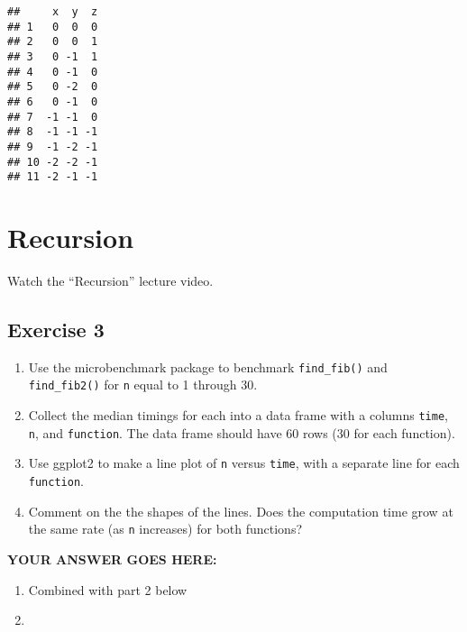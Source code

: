 \documentclass[
]{article}
\providecommand{\tightlist}{%
  \setlength{\itemsep}{0pt}\setlength{\parskip}{0pt}}
\begin{document}
\begin{verbatim}
##     x  y  z
## 1   0  0  0
## 2   0  0  1
## 3   0 -1  1
## 4   0 -1  0
## 5   0 -2  0
## 6   0 -1  0
## 7  -1 -1  0
## 8  -1 -1 -1
## 9  -1 -2 -1
## 10 -2 -2 -1
## 11 -2 -1 -1
\end{verbatim}

\hypertarget{recursion}{%
\section{Recursion}\label{recursion}}

Watch the ``Recursion'' lecture video.

\hypertarget{exercise-3}{%
\subsection{Exercise 3}\label{exercise-3}}

\begin{enumerate}
\def\labelenumi{\arabic{enumi}.}
\item
  Use the microbenchmark package to benchmark \texttt{find\_fib()} and
  \texttt{find\_fib2()} for \texttt{n} equal to 1 through 30.
\item
  Collect the median timings for each into a data frame with a columns
  \texttt{time}, \texttt{n}, and \texttt{function}. The data frame
  should have 60 rows (30 for each function).
\item
  Use ggplot2 to make a line plot of \texttt{n} versus \texttt{time},
  with a separate line for each \texttt{function}.
\item
  Comment on the the shapes of the lines. Does the computation time grow
  at the same rate (as \texttt{n} increases) for both functions?
\end{enumerate}

\textbf{YOUR ANSWER GOES HERE:}

\begin{enumerate}
\def\labelenumi{\arabic{enumi}.}
\tightlist
\item
  Combined with part 2 below
\item
\end{enumerate}
\end{document}
